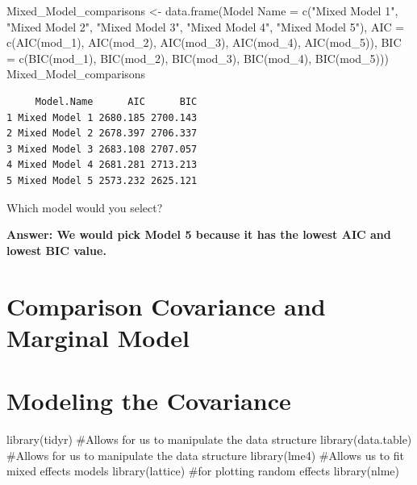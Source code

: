 \documentclass[
  letterpaper,
  DIV=11,
  numbers=noendperiod]{scrreprt}
\newenvironment{Shaded}{\begin{snugshade}}{\end{snugshade}}
\newcommand{\AttributeTok}[1]{\textcolor[rgb]{0.40,0.45,0.13}{#1}}
\newcommand{\CommentTok}[1]{\textcolor[rgb]{0.37,0.37,0.37}{#1}}
\newcommand{\FunctionTok}[1]{\textcolor[rgb]{0.28,0.35,0.67}{#1}}
\newcommand{\NormalTok}[1]{\textcolor[rgb]{0.00,0.23,0.31}{#1}}
\newcommand{\OtherTok}[1]{\textcolor[rgb]{0.00,0.23,0.31}{#1}}
\newcommand{\StringTok}[1]{\textcolor[rgb]{0.13,0.47,0.30}{#1}}
\begin{document}
\begin{Shaded}
\begin{Highlighting}[]
\NormalTok{Mixed\_Model\_comparisons }\OtherTok{\textless{}{-}} \FunctionTok{data.frame}\NormalTok{(}\StringTok{\textasciigrave{}}\AttributeTok{Model Name}\StringTok{\textasciigrave{}} \OtherTok{=} \FunctionTok{c}\NormalTok{(}\StringTok{"Mixed Model 1"}\NormalTok{, }\StringTok{"Mixed Model 2"}\NormalTok{,}
    \StringTok{"Mixed Model 3"}\NormalTok{, }\StringTok{"Mixed Model 4"}\NormalTok{, }\StringTok{"Mixed Model 5"}\NormalTok{), }\AttributeTok{AIC =} \FunctionTok{c}\NormalTok{(}\FunctionTok{AIC}\NormalTok{(mod\_1), }\FunctionTok{AIC}\NormalTok{(mod\_2),}
    \FunctionTok{AIC}\NormalTok{(mod\_3), }\FunctionTok{AIC}\NormalTok{(mod\_4), }\FunctionTok{AIC}\NormalTok{(mod\_5)), }\AttributeTok{BIC =} \FunctionTok{c}\NormalTok{(}\FunctionTok{BIC}\NormalTok{(mod\_1), }\FunctionTok{BIC}\NormalTok{(mod\_2), }\FunctionTok{BIC}\NormalTok{(mod\_3),}
    \FunctionTok{BIC}\NormalTok{(mod\_4), }\FunctionTok{BIC}\NormalTok{(mod\_5)))}
\NormalTok{Mixed\_Model\_comparisons}
\end{Highlighting}
\end{Shaded}

\begin{verbatim}
     Model.Name      AIC      BIC
1 Mixed Model 1 2680.185 2700.143
2 Mixed Model 2 2678.397 2706.337
3 Mixed Model 3 2683.108 2707.057
4 Mixed Model 4 2681.281 2713.213
5 Mixed Model 5 2573.232 2625.121
\end{verbatim}

Which model would you select?

\textbf{Answer: We would pick Model 5 because it has the lowest AIC and
lowest BIC value.}

\hypertarget{sec-longi-compare}{%
\chapter{Comparison Covariance and Marginal
Model}\label{sec-longi-compare}}

\hypertarget{sec-longi-covmodel}{%
\chapter{Modeling the Covariance}\label{sec-longi-covmodel}}

\begin{Shaded}
\begin{Highlighting}[]
\FunctionTok{library}\NormalTok{(tidyr)  }\CommentTok{\#Allows for us to manipulate the data structure}
\FunctionTok{library}\NormalTok{(data.table)  }\CommentTok{\#Allows for us to manipulate the data structure}
\FunctionTok{library}\NormalTok{(lme4)  }\CommentTok{\#Allows us to fit mixed effects models}
\FunctionTok{library}\NormalTok{(lattice)  }\CommentTok{\#for plotting random effects}
\FunctionTok{library}\NormalTok{(nlme)}
\end{Highlighting}
\end{Shaded}
\end{document}
